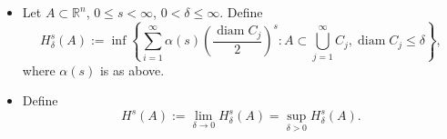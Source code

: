     \begin{definition}
        \begin{itemize}
            \item[(i)] Let $A\subset \mathbb{R}^{n}$, $0\leq s<\infty$, $0< \delta \leq \infty$. Define
                \[
                H_{\delta}^{s}(A):= \inf\left\{  \sum _{i=1}^{\infty}\alpha(s)\left( \frac{\operatorname{diam}C_{j}}{2} \right)^{s}:A\subset\bigcup _{j=1}^{\infty}C_{j}  ,\operatorname{diam}C_{j}\leq \delta\right\},
                \]
                where $\alpha(s)$ is as above.
            \item[(ii)] Define
                \[
                H^{s}(A):=\lim_{ \delta \to 0 } H_{\delta}^{s}(A)=\sup_{\delta>0}H_{\delta}^{s}(A).
                \]
        \end{itemize}
    \end{definition}

